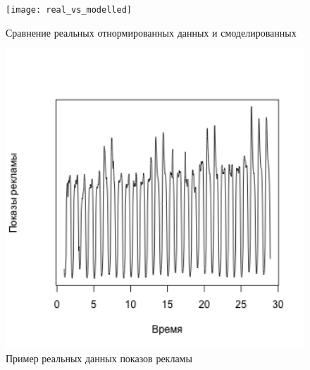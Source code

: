 \documentclass[%
12pt,
master,  %
natbib,      %
subf,        %
substylefile = spbu.rtx,
href,        %
colorlinks,  %
]{disser}
\begin{document}
\begin{figure}[!hhh]
	\begin{center}
		\texttt{[image: real\_vs\_modelled]}
	\end{center}
	\vspace{-5mm}\caption{Сравнение реальных отнормированных данных и смоделированных}
	\label{fig:real_vs_modelled}
\end{figure}


\begin{figure}[!hhh]
	\begin{center}
		\includegraphics[width=12cm]{examples_long_ts}
	\end{center}
	\vspace{-5mm}\caption{Пример реальных данных показов рекламы}
	\label{fig:examples_long_ts}
\end{figure}
\end{document}
